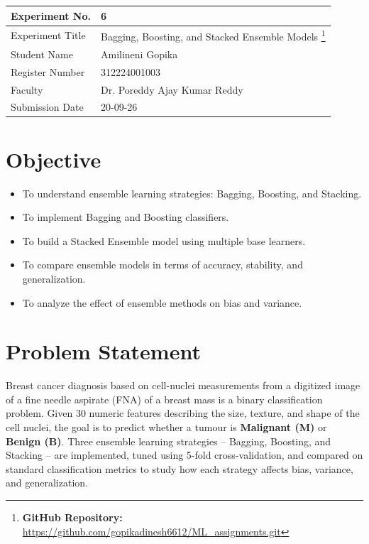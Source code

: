 \documentclass[12pt,a4paper]{article}
\begin{document}
\begin{tabular}{|p{4cm}|p{11cm}|}
\hline
Experiment No. & 6 \\ \hline
Experiment Title & Bagging, Boosting, and Stacked Ensemble Models
\footnote{\textbf{GitHub Repository: }\url{https://github.com/gopikadinesh6612/ML_assignments.git}}\\ \hline
Student Name & Amilineni Gopika\\ \hline
Register Number & 312224001003 \\ \hline
Faculty & Dr. Poreddy Ajay Kumar Reddy \\ \hline
Submission Date &20-09-26 \\ \hline
\end{tabular}

\section{Objective}
\begin{itemize}[nosep]
\item To understand ensemble learning strategies: Bagging, Boosting, and Stacking.
\item To implement Bagging and Boosting classifiers.
\item To build a Stacked Ensemble model using multiple base learners.
\item To compare ensemble models in terms of accuracy, stability, and generalization.
\item To analyze the effect of ensemble methods on bias and variance.
\end{itemize}

\section{Problem Statement}
Breast cancer diagnosis based on cell-nuclei measurements from a digitized image of a fine
needle aspirate (FNA) of a breast mass is a binary classification problem. Given 30 numeric
features describing the size, texture, and shape of the cell nuclei, the goal is to predict
whether a tumour is \textbf{Malignant (M)} or \textbf{Benign (B)}. Three ensemble learning
strategies -- Bagging, Boosting, and Stacking -- are implemented, tuned using 5-fold
cross-validation, and compared on standard classification metrics to study how each strategy
affects bias, variance, and generalization.
\end{document}
